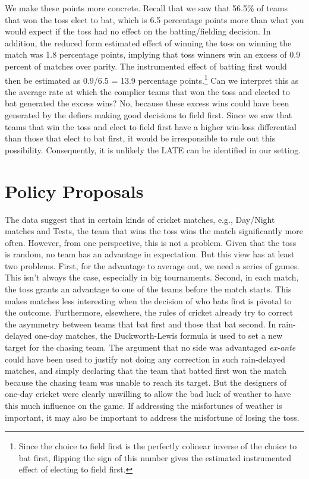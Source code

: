 \documentclass[12pt, letterpaper]{article}
\begin{document}
We make these points more concrete. Recall that we saw that 56.5\% of teams that won the toss elect to bat, which is 6.5 percentage points more than what you would expect if the toss had no effect on the batting/fielding decision. In addition, the reduced form estimated effect of winning the toss on winning the match was 1.8 percentage points, implying that toss winners win an excess of 0.9 percent of matches over parity. The instrumented effect of batting first would then be estimated as 0.9/6.5 = 13.9 percentage points.\footnote{Since the choice to field first is the perfectly colinear inverse of the choice to bat first, flipping the sign of this number gives the estimated instrumented effect of electing to field first.} Can we interpret this as the average rate at which the complier teams that won the toss and elected to bat generated the excess wins? No, because these excess wins could have been generated by the defiers making good decisions to field first. Since we saw that teams that win the toss and elect to field first have a higher win-loss differential than those that elect to bat first, it would be irresponsible to rule out this possibility. Consequently, it is unlikely the LATE can be identified in our setting.

\section{Policy Proposals}

The data suggest that in certain kinds of cricket matches, e.g., Day/Night matches and Tests, the team that wins the toss wins the match significantly more often. However, from one perspective, this is not a problem. Given that the toss is random, no team has an advantage in expectation. But this view has at least two problems. First, for the advantage to average out, we need a series of games. This isn't always the case, especially in big tournaments. Second, in each match, the toss grants an advantage to one of the teams before the match starts. This makes matches less interesting when the decision of who bats first is pivotal to the outcome. Furthermore, elsewhere, the rules of cricket already try to correct the asymmetry between teams that bat first and those that bat second. In rain-delayed one-day matches, the Duckworth-Lewis formula is used to set a new target for the chasing team. The argument that no side was advantaged \emph{ex-ante} could have been used to justify not doing any correction in such rain-delayed matches, and simply declaring that the team that batted first won the match because the chasing team was unable to reach its target. But the designers of one-day cricket were clearly unwilling to allow the bad luck of weather to have this much influence on the game. If addressing the misfortunes of weather is important, it may also be important to address the misfortune of losing the toss.
\end{document}
